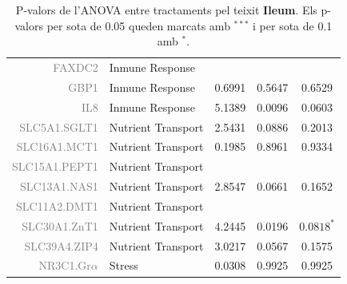 \documentclass[english]{article}
\begin{document}
\begin{table}[ht]
\begin{tabular}{rlrrc}
  {\textcolor{gray}{FAXDC2}} & Inmune Response &  &  &  \\
  {\textcolor{gray}{GBP1}} & Inmune Response & 0.6991 & 0.5647 & 0.6529 \\
  {\textcolor{gray}{IL8}} & Inmune Response & 5.1389 & 0.0096 & 0.0603 \\
  {\textcolor{gray}{SLC5A1.SGLT1}} & Nutrient Transport& 2.5431 & 0.0886 & 0.2013 \\
  {\textcolor{gray}{SLC16A1.MCT1}} & Nutrient Transport & 0.1985 & 0.8961 & 0.9334 \\
  {\textcolor{gray}{SLC15A1.PEPT1}} & Nutrient Transport &  &  &  \\
  {\textcolor{gray}{SLC13A1.NAS1}} & Nutrient Transport & 2.8547 & 0.0661 & 0.1652 \\
  {\textcolor{gray}{SLC11A2.DMT1}} & Nutrient Transport &  &  &  \\
  {\textcolor{gray}{SLC30A1.ZnT1}} & Nutrient Transport & 4.2445 & 0.0196 & $0.0818^{*}$ \\
  {\textcolor{gray}{SLC39A4.ZIP4}} & Nutrient Transport & 3.0217 & 0.0567 & 0.1575 \\
  {\textcolor{gray}{NR3C1.Gr$\alpha$}} & Stress & 0.0308 & 0.9925 & 0.9925 \\
   \bottomrule
\end{tabular}
\caption{P-valors de l'ANOVA entre tractaments pel teixit \textbf{Ileum}. Els p-valors per sota de 0.05 queden marcats amb $^{***}$ i per sota de 0.1 amb $^{*}$.}
\end{table}
\end{document}
